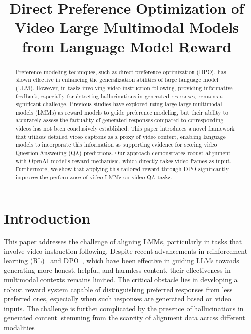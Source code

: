 \title{Direct Preference Optimization of Video Large Multimodal Models from Language Model Reward}



\maketitle

\begin{abstract}

Preference modeling techniques, such as direct preference optimization (DPO), has shown effective in enhancing the generalization abilities of large language model (LLM). However, in tasks involving video instruction-following, providing informative feedback, especially for detecting hallucinations in generated responses, remains a significant challenge. Previous studies have explored using large large multimodal models (LMMs) as reward models to guide preference modeling, but their ability to accurately assess the factuality of generated responses compared to corresponding videos has not been conclusively established. This paper introduces a novel framework that utilizes detailed video captions as a proxy of video content, enabling language models to incorporate this information as supporting evidence for scoring video Question Answering (QA) predictions. Our approach demonstrates robust alignment with OpenAI \gptv model's reward mechanism, which directly takes video frames as input. Furthermore, we show that applying this tailored reward through DPO significantly improves the performance of video LMMs on video QA tasks.

\end{abstract}
\section{Introduction}
\label{sec:intro}

This paper addresses the challenge of aligning LMMs, particularly in tasks that involve video instruction following. Despite recent advancements in reinforcement learning (RL)~\citep{ouyang2022training, bai2022constitutional, lee2023rlaif, sun2023salmon} and DPO~\citep{rafailov2024direct, chen2024self, hosseini2024v}, which have been effective in guiding LLMs towards generating more honest, helpful, and harmless content, their effectiveness in multimodal contexts remains limited. The critical obstacle lies in developing a robust reward system capable of distinguishing preferred responses from less preferred ones, especially when such responses are generated based on video inputs. The challenge is further complicated by the presence of hallucinations in generated content, stemming from the scarcity of alignment data across different modalities~\citep{liu2023visual, sun2023aligning}.

